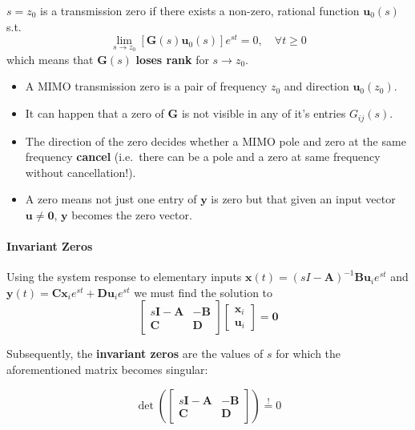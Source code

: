 $s = z_0$ is a transmission zero if there exists a non-zero, rational function $\mathbf{u}_0(s)$ s.t.
\begin{equation*}
    \lim_{s\to z_0}\left[\mathbf{G}(s)\mathbf{u}_0(s)\right]e^{st}=0,\quad\forall t\geq0
\end{equation*}
which means that $\mathbf{\mathbf{G}}(s)$ \textbf{loses rank} for $s\rightarrow z_0$.


\begin{itemize}
    \item A MIMO transmission zero is a pair of frequency $z_0$ and direction $\mathbf{u}_0(z_0)$.
    \item It can happen that a zero of $\mathbf{G}$ is not visible in any of it's entries $G_{ij}(s)$.
    \item The direction of the zero decides whether a MIMO pole and zero at the same frequency \textbf{cancel} (i.e.\ there can be a pole and a zero at same frequency without cancellation!).
    \item A zero means not just one entry of $\mathbf{y}$ is zero but that given an input vector $\mathbf{u} \ne \mathbf{0}$, $\mathbf{y}$ becomes the zero vector.
\end{itemize}

\paragraph{Invariant Zeros}

Using the system response to elementary inputs $\mathbf{x}(t)={(sI-\mathbf{A})}^{-1}\mathbf{Bu}_i e^{st}$ and $\mathbf{y}(t)=\mathbf{Cx}_i e^{st}+\mathbf{Du}_i e^{st}$ we must find the solution to
\begin{equation*}
    \begin{bmatrix}
        s\mathbf{I}-\mathbf{A} & -\mathbf{B} \\
        \mathbf{C}             & \mathbf{D}
    \end{bmatrix}
    \begin{bmatrix}
        \mathbf{x}_i \\
        \mathbf{u}_i
    \end{bmatrix}=\mathbf{0}
\end{equation*}

Subsequently, the \textbf{invariant zeros} are the values of $s$ for which the aforementioned matrix becomes singular:

\noindent\begin{equation*}
    \det \left(\begin{bmatrix}
            s\mathbf{I}-\mathbf{A} & -\mathbf{B} \\
            \mathbf{C}             & \mathbf{D}
        \end{bmatrix}\right) \overset{!}{=}0
\end{equation*}


